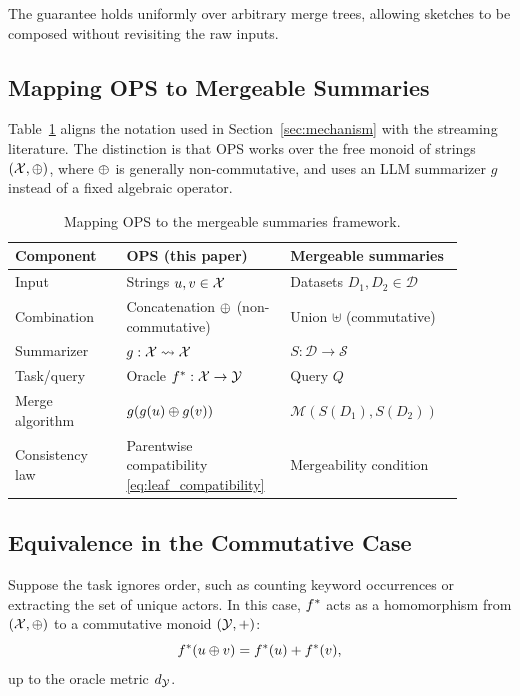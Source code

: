 The guarantee holds uniformly over arbitrary merge trees, allowing sketches to be composed without revisiting the raw inputs.

\subsection{Mapping OPS to Mergeable Summaries}

Table~\ref{tab:mergeable_mapping} aligns the notation used in Section~\ref{sec:mechanism} with the streaming literature. The distinction is that OPS works over the free monoid of strings $(\mathcal{X},\oplus)$, where $\oplus$ is generally non-commutative, and uses an LLM summarizer $g$ instead of a fixed algebraic operator.

\begin{table}[t]
    \centering
    \begin{tabular}{p{0.23\linewidth}p{0.33\linewidth}p{0.33\linewidth}}
        \toprule
        \textbf{Component} & \textbf{OPS (this paper)} & \textbf{Mergeable summaries} \\
        \midrule
        Input & Strings $u,v\in\mathcal{X}$ & Datasets $D_1,D_2\in\mathcal{D}$ \\
        Combination & Concatenation $\oplus$ (non-commutative) & Union $\uplus$ (commutative) \\
        Summarizer & $g:\mathcal{X}\rightsquigarrow\mathcal{X}$ & $S:\mathcal{D}\to\mathcal{S}$ \\
        Task/query & Oracle $f^{\ast}:\mathcal{X}\to\mathcal{Y}$ & Query $Q$ \\
        Merge algorithm & $g(g(u)\oplus g(v))$ & $\mathcal{M}(S(D_1),S(D_2))$ \\
        Consistency law & Parentwise compatibility \eqref{eq:leaf_compatibility} & Mergeability condition \\
        \bottomrule
    \end{tabular}
    \caption{Mapping OPS to the mergeable summaries framework.}
    \label{tab:mergeable_mapping}
\end{table}

\subsection{Equivalence in the Commutative Case}

Suppose the task ignores order, such as counting keyword occurrences or extracting the set of unique actors. In this case, $f^{\ast}$ acts as a homomorphism from $(\mathcal{X},\oplus)$ to a commutative monoid $(\mathcal{Y},+)$:
\[
    f^{\ast}(u\oplus v) = f^{\ast}(u) + f^{\ast}(v),
\]
up to the oracle metric $d_{\mathcal{Y}}$.

